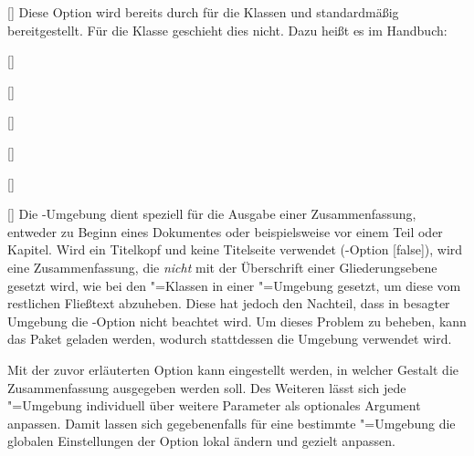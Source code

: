 \documentclass[english,ngerman,ToDo=no]{tudscrman3}
\begin{document}
\begin{Declaration}{[\PSet]}%
\printdeclarationlist%
%
%
%
Diese Option wird bereits durch \KOMAScript{} für die Klassen  
und  standardmäßig bereitgestellt. Für die Klasse 
 geschieht dies nicht. Dazu heißt es im Handbuch:
\end{Declaration}

\begin{Declaration}{[]}
\begin{Declaration}[v2.02]{}
\begin{Declaration}{[]}
\begin{Declaration}[v2.02]{%
  []%
}
\begin{Declaration}[v2.02]{%
  []%
}
\begin{Declaration}{[]}
\begin{Declaration}{[\PSet]}{%
}
\printdeclarationlist%
%
%
Die -Umgebung dient speziell für die Ausgabe einer 
Zusammenfassung, entweder zu Beginn eines Dokumentes oder beispielsweise vor 
einem Teil oder Kapitel. Wird ein Titelkopf und keine Titelseite verwendet 
(\KOMAScript-Option [false]), wird eine Zusammenfassung, die  
\emph{nicht} mit der Überschrift einer Gliederungsebene gesetzt wird, wie bei 
den \KOMAScript"=Klassen in einer "=Umgebung gesetzt, um 
diese vom restlichen Fließtext abzuheben. Diese hat jedoch den Nachteil, dass 
in besagter Umgebung die \KOMAScript-Option  nicht beachtet 
wird. Um dieses Problem zu beheben, kann das Paket  geladen 
werden, wodurch stattdessen die Umgebung  verwendet wird.

Mit der zuvor erläuterten Option  kann eingestellt werden, in 
welcher Gestalt die Zusammenfassung ausgegeben werden soll. Des Weiteren lässt 
sich jede "=Umgebung individuell über weitere Parameter 
als optionales Argument anpassen. Damit lassen sich gegebenenfalls für eine 
bestimmte "=Umgebung die globalen Einstellungen 
der Option  lokal ändern und gezielt anpassen. 


\end{Declaration}
\end{Declaration}
\end{Declaration}
\end{Declaration}
\end{Declaration}
\end{Declaration}
\end{Declaration}
\end{document}
